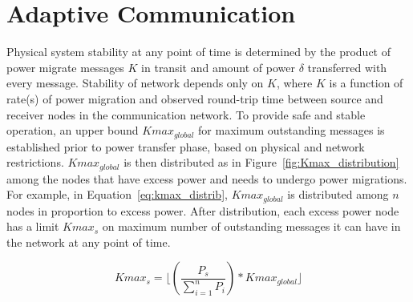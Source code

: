%
 
\section{Adaptive Communication} 
\label{adap_comm}

Physical system stability at any point of time is determined by the product of power migrate messages
$K$ in transit and amount of power $\delta$ transferred with every message. 
Stability of network depends only on $K$, where $K$ is a function of rate(s) of power migration
and observed round-trip time between source and receiver nodes in the communication network.
To provide safe and stable operation, an upper bound $Kmax_{global}$ for maximum outstanding messages 
is established prior to power transfer phase, based on physical and network restrictions. $Kmax_{global}$ 
is then distributed as in Figure~\ref{fig:Kmax_distribution} among the nodes that have excess power 
and needs to undergo power migrations. For example, in Equation~\ref{eq:kmax_distrib}, $Kmax_{global}$ 
is distributed among $n$ nodes in proportion to excess power. After distribution, each excess power 
node has a limit $Kmax_s$ on maximum number of outstanding messages it can have in the network at any 
point of time.

\begin{equation}
Kmax_s = \lfloor(\frac{P_s}{\sum_{i=1}^{n} P_i}) * Kmax_{global}\rfloor
\label{eq:kmax_distrib}
\end{equation}

